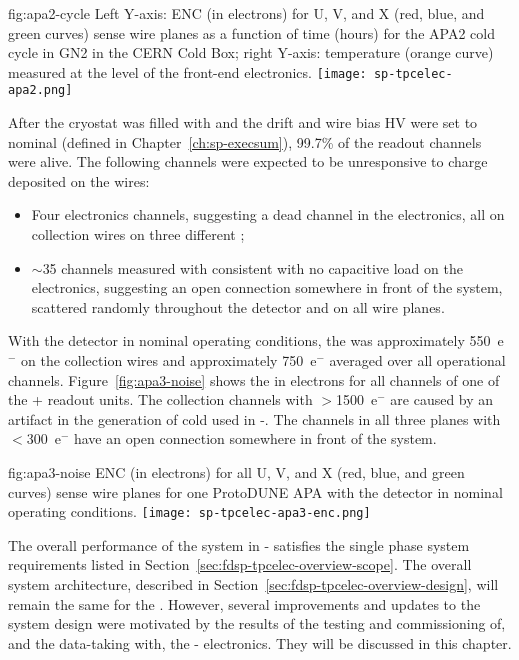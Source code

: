 \begin{dunefigure}
{fig:apa2-cycle}
{Left Y-axis: ENC (in electrons) for U, V, and X (red, blue, and green curves) sense wire planes as a function of time (hours) for the APA2 cold cycle in GN2 in the CERN Cold Box; right Y-axis: temperature (orange curve) measured at the level of the front-end electronics.}
\texttt{[image: sp-tpcelec-apa2.png]}
\end{dunefigure}

After the cryostat was filled with  and the drift and wire bias HV were set to nominal (defined in Chapter~\ref{ch:sp-execsum}), 99.7\% of the  readout channels were alive. The following channels were expected to be unresponsive to charge deposited on the wires:
\begin{itemize}
\item Four electronics channels, suggesting a dead channel in the electronics, all on collection wires on three different ;
\item $\sim$35 channels measured with  consistent with no capacitive load on the  electronics, suggesting an open connection somewhere in front of the  system, scattered randomly throughout the detector and on all wire planes.
\end{itemize}
With the detector in nominal operating conditions, the  was approximately 550~e$^-$ on the collection wires and approximately 750~e$^-$ averaged over all operational channels. Figure~\ref{fig:apa3-noise} shows the  in electrons for all channels of one of the + readout units. The collection channels with $>$1500~e$^-$ are caused by an artifact in the generation of cold   used in -. The channels in all three planes with $<$300~e$^-$ have an open connection somewhere in front of the  system.

\begin{dunefigure}
{fig:apa3-noise}
{ENC (in electrons) for all U, V, and X (red, blue, and green curves) sense wire planes for one ProtoDUNE APA with the detector in nominal operating conditions.}
\texttt{[image: sp-tpcelec-apa3-enc.png]}
\end{dunefigure}

The overall performance of the  system in - satisfies the  single phase   system requirements listed in Section~\ref{sec:fdsp-tpcelec-overview-scope}. The overall system architecture, described in Section~\ref{sec:fdsp-tpcelec-overview-design}, will remain the same for the  . However, several improvements and updates to the  system design were motivated by the results of the testing and commissioning of, and the data-taking with, the - electronics. They will be discussed in this chapter.

